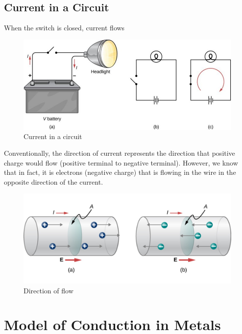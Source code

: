 \documentclass[14pt]{memoir}
\begin{document}
\subsection{Current in a Circuit}

When the switch is closed, current flows

\begin{figure}[H]
\begin{center}
\includegraphics[scale=0.50]{fig/fig_09_05.jpg}
\caption{Current in a circuit}
\label{fig:09_05}
\end{center}
\end{figure}

Conventionally, the direction of current represents the direction that positive charge would flow (positive terminal to negative terminal). However, we know that in fact, it is electrons (negative charge) that is flowing in the wire in the opposite direction of the current.

\begin{figure}[H]
\begin{center}
\includegraphics[scale=0.50]{fig/fig_09_06.jpg}
\caption{Direction of flow}
\label{fig:09_06}
\end{center}
\end{figure}

\section{Model of Conduction in Metals}
\end{document}
